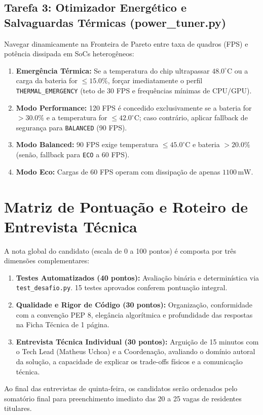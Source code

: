 \subsection{Tarefa 3: Otimizador Energético e Salvaguardas Térmicas (power\_tuner.py)}
Navegar dinamicamente na Fronteira de Pareto entre taxa de quadros (FPS) e potência dissipada em SoCs heterogêneos:
\begin{enumerate}
    \item \textbf{Emergência Térmica:} Se a temperatura do chip ultrapassar $48.0^\circ\text{C}$ ou a carga da bateria for $\le 15.0\%$, forçar imediatamente o perfil \texttt{THERMAL\_EMERGENCY} (teto de 30 FPS e frequências mínimas de CPU/GPU).
    \item \textbf{Modo Performance:} 120 FPS é concedido exclusivamente se a bateria for $> 30.0\%$ e a temperatura for $\le 42.0^\circ\text{C}$; caso contrário, aplicar fallback de segurança para \texttt{BALANCED} (90 FPS).
    \item \textbf{Modo Balanced:} 90 FPS exige temperatura $\le 45.0^\circ\text{C}$ e bateria $> 20.0\%$ (senão, fallback para \texttt{ECO} a 60 FPS).
    \item \textbf{Modo Eco:} Cargas de 60 FPS operam com dissipação de apenas $1100\,\text{mW}$.
\end{enumerate}

\section{Matriz de Pontuação e Roteiro de Entrevista Técnica}
\label{sec:rubrica_avaliacao}

A nota global do candidato (escala de 0 a 100 pontos) é composta por três dimensões complementares:
\begin{enumerate}
    \item \textbf{Testes Automatizados (40 pontos):} Avaliação binária e determinística via \texttt{test\_desafio.py}. 15 testes aprovados conferem pontuação integral.
    \item \textbf{Qualidade e Rigor de Código (30 pontos):} Organização, conformidade com a convenção PEP 8, elegância algorítmica e profundidade das respostas na Ficha Técnica de 1 página.
    \item \textbf{Entrevista Técnica Individual (30 pontos):} Arguição de 15 minutos com o Tech Lead (Matheus Uchoa) e a Coordenação, avaliando o domínio autoral da solução, a capacidade de explicar os trade-offs físicos e a comunicação técnica.
\end{enumerate}

Ao final das entrevistas de quinta-feira, os candidatos serão ordenados pelo somatório final para preenchimento imediato das 20 a 25 vagas de residentes titulares.
